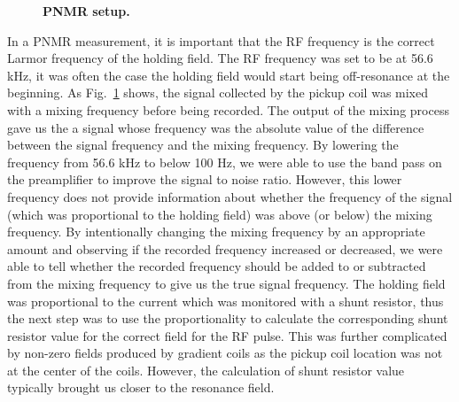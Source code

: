 \begin{figure}[t!]
	\centering
	\caption{{\bf PNMR setup.}}
	\label{PNMR_setup}
\end{figure}

In a PNMR measurement, it is important that the RF frequency is the correct Larmor frequency of the holding field. The RF frequency was set to be at 56.6 kHz, it was often the case the holding field would start being off-resonance at the beginning.  As Fig.~\ref{PNMR_setup} shows, the signal collected by the pickup coil was mixed with a mixing frequency before being recorded. The output of the mixing process gave us the a signal whose frequency was the absolute value of the difference between the signal frequency and the mixing frequency. By lowering the frequency from 56.6 kHz to below 100 Hz, we were able to use the band pass on the preamplifier to improve the signal to noise ratio. However, this lower frequency does not provide information about whether the frequency of the signal (which was proportional to the holding field) was above (or below) the mixing frequency. By intentionally changing the mixing frequency by an appropriate amount and observing if the recorded frequency increased or decreased, we were able to tell whether the recorded frequency should be added to or subtracted from the mixing frequency to give us the true signal frequency. The holding field was proportional to the current which was monitored with a shunt resistor, thus the next step was to use the proportionality to calculate the corresponding shunt resistor value for the correct field for the RF pulse. This was further complicated by non-zero fields produced by gradient coils as the pickup coil location was not at the center of the coils. However, the calculation of shunt resistor value typically brought us closer to the resonance field. 

